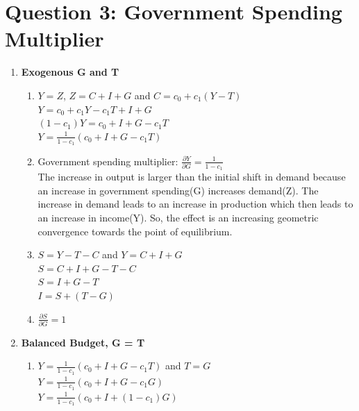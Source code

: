 \documentclass[a4paper, 11pt]{article}
\begin{document}
\section*{\textbf{Question 3: Government Spending Multiplier}}
\begin{enumerate}[label=\textbf{(\alph*)}]
\item \textbf{Exogenous G and T}
\begin{enumerate}[label=\textbf{\arabic*.}]
\item $ Y = Z$,  $Z = C + I + G$ and $C = c_0 + c_1(Y - T)$\\

$Y = c_0 + c_1Y-c_1T + I +G$\\
$(1-c_1)Y = c_0 + I +G - c_1T$\\
$Y = \frac{1}{1-c_1} (c_0 + I + G - c_1T)$\\

\item Government spending multiplier: $\frac{\partial Y}{\partial G} = \frac{1}{1-c_1}$\\

The increase in output is larger than the initial shift in demand because an increase in government spending(G) increases demand(Z). The increase in demand leads to an increase in production which then leads to an increase in income(Y). So, the effect is an increasing geometric convergence towards the point of equilibrium.  

\item $S = Y - T - C$ and $Y = C + I + G$\\

$S = C + I + G - T -C$\\
$S = I + G - T$\\
$I = S + (T - G)$\\

\item $\frac{\partial S}{\partial G} = 1$

\end{enumerate}
\clearpage
\item \textbf{Balanced Budget, G = T}
\begin{enumerate}[label=\textbf{\arabic*.}]
\item $Y = \frac{1}{1-c_1} (c_0 + I + G - c_1T)$ and $T = G$\\

$Y = \frac{1}{1-c_1} (c_0 + I + G - c_1G)$\\
$Y = \frac{1}{1-c_1} (c_0 + I +(1-c_1)G)$\\


\end{enumerate}
\end{enumerate}
\end{document}

